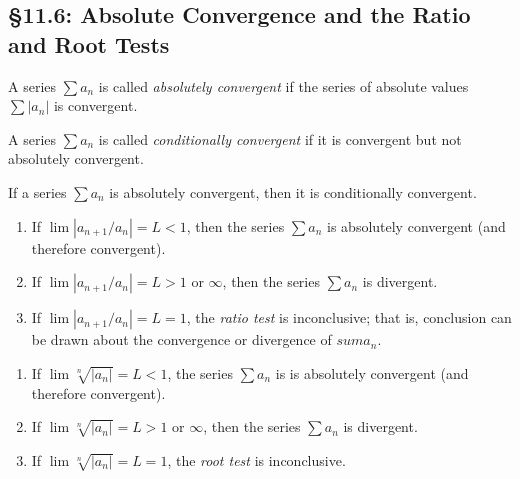 \subsection*{\S 11.6: Absolute Convergence and the Ratio and Root Tests}
\begin{definition}
A series $\sum a_n$ is called \emph{absolutely convergent} if the series of
absolute values $\sum |a_n|$ is convergent.
\end{definition}
\begin{definition}
A series $\sum a_n$ is called \emph{conditionally convergent} if it is
convergent but not absolutely convergent.
\end{definition}
\begin{theorem}
If a series $\sum a_n$ is absolutely convergent, then it is conditionally
convergent.
\end{theorem}
\begin{theorem}
\begin{enumerate}[label=\textnormal{(\roman*)},noitemsep]
\item If $\lim\left|a_{n+1}/a_n\right|=L<1$, then the series
  $\sum a_n$ is absolutely convergent (and therefore convergent).
\item If $\lim\left|a_{n+1}/a_n\right|=L>1$ or $\infty$, then the series
  $\sum a_n$ is divergent.
\item If $\lim\left|a_{n+1}/a_n\right|=L=1$, the \emph{ratio test} is
  inconclusive; that is, conclusion can be drawn about the convergence or
  divergence of $sum a_n$.
\end{enumerate}
\end{theorem}
\begin{theorem}
\begin{enumerate}[label=\textnormal{(\roman*)},noitemsep]
\item If $\lim\sqrt[n]{|a_n|}=L<1$, the series $\sum a_n$ is is absolutely
  convergent (and therefore convergent).
\item If $\lim\sqrt[n]{|a_n|}=L>1$ or $\infty$, then the series $\sum
  a_n$ is divergent.
\item If $\lim\sqrt[n]{|a_n|}=L=1$, the \emph{root test} is inconclusive.
\end{enumerate}
\end{theorem}
